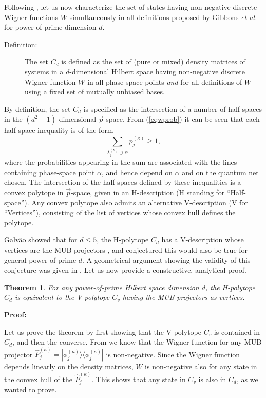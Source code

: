 \documentclass[aps,twocolumn,showpacs,nofootinbib,superscriptaddress]{revtex4}
\newtheorem{theorem}{Theorem}
\newcommand{\proof}{{\bf Proof:}}
\begin{document}
Following \cite{Galvao05}, let us now characterize the set of
states having non-negative discrete Wigner functions $W$
simultaneously in all definitions proposed by Gibbons \textit{et
al.} \cite{GibbonsHW04} for power-of-prime dimension $d$.

\begin{description}
\item[Definition:] The set $C_d$ is defined as the set of (pure or mixed) density
matrices of systems in a $d$-dimensional Hilbert space having non-negative discrete
Wigner function $W$ in all phase-space points \textit{and} for all definitions of $W$
using a fixed set of mutually unbiased bases.
\end{description}
By definition, the set $C_d$ is specified as the intersection of a
number of half-spaces in the $(d^2-1)$-dimensional $\vec{p}$-space. From (\ref{eqwprob}) it can be seen that each half-space inequality is of the form
\begin{equation}
 \sum_{\lambda^{(\kappa)}_j \ni \alpha} p^{(\kappa)}_j \ge 1,
\end{equation}
where the probabilities appearing in the sum are associated with the lines containing phase-space point $\alpha$, and hence depend on $\alpha$ and on the quantum net chosen. The intersection of the half-spaces defined by these inequalities is a convex polytope in $\vec{p}$-space, given in an H-description (H
standing for ``Half-space''). Any convex polytope also admits an alternative V-description
(V for ``Vertices''), consisting of the list of vertices whose convex hull defines the polytope.

Galv{\~a}o showed that for $d \le 5$, the H-polytope $C_d$ has a V-description whose
vertices are the MUB projectors \cite{Galvao05}, and conjectured this would also be
true for general power-of-prime $d$. A geometrical argument showing the validity of
this conjecture was given in \cite{Bengtsson04, BengtssonE04}. Let us now provide a constructive, analytical proof.
\begin{theorem}
For any power-of-prime Hilbert space dimension $d$, the H-polytope $C_d$ is equivalent to the V-polytope $C_v$ having the MUB projectors as vertices. \label{thm:statics}
\end{theorem}
\proof

Let us prove the theorem by first showing that the V-polytope $C_v$ is contained in $C_d$, and then the converse. From \cite{GibbonsHW04} we know that the Wigner function for any MUB projector
$\hat{P}_{j}^{(\kappa)}=|\phi_{j}^{(\kappa)}\rangle
\langle\phi_{j}^{(\kappa)}|$ is non-negative. Since
the Wigner function depends linearly on the density
matrices, $W$ is non-negative also for any state in the convex
hull of the $\hat{P}_{j}^{(\kappa)}$. This shows that any state in
$C_v$ is also in $C_d$, as we wanted to prove.
\end{document}
